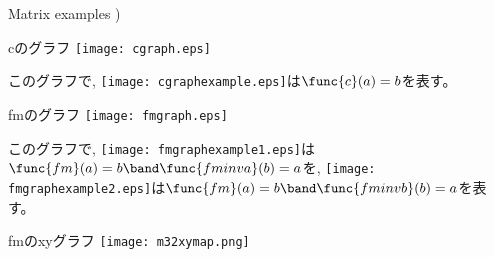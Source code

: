 \documentclass{mystyle}
\begin{document}
\begin{section}{Matrix examples}
{{{{        %
    }\right)}%
}
}
\end{section}
%
\begin{section}{cのグラフ}
\texttt{[image: cgraph.eps]}\par\nobreak
このグラフで, \texttt{[image: cgraphexample.eps]}は$\func{c}(a)=b$を表す。
\end{section}
%
\begin{section}{fmのグラフ}
\texttt{[image: fmgraph.eps]}\par\nobreak
このグラフで, \texttt{[image: fmgraphexample1.eps]}は$\func{fm}(a)=b\band\func{fminva}(b)=a$を, \texttt{[image: fmgraphexample2.eps]}は$\func{fm}(a)=b\band\func{fminvb}(b)=a$を表す。
\end{section}
%
\begin{section}{fmのxyグラフ}
\texttt{[image: m32xymap.png]}
\end{section}
%
\end{document}
